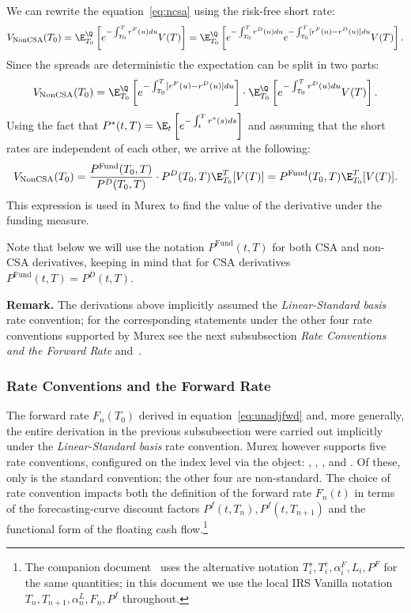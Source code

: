 \documentclass[]{pmv_report} %
\begin{document}
We can rewrite the equation~\eqref{eq:ncsa} using the risk-free short rate:
\begin{align*}
V_{\text{NonCSA}}(T_0)=\E_{T_0}^{\Q} \left[ e^{-\int_{T_0}^T r^F(u)du} V(T)\right] =\E_{T_0}^{\Q} \left[ e^{-\int_{T_0}^T r^D(u)du} e^{-\int_{T_0}^T [r^F(u)-r^D(u)]du}V(T)\right].
\end{align*}
Since the spreads are deterministic the expectation can be split in two parts:
\begin{equation*}
V_{\text{NonCSA}}({T_0})= \E_{T_0}^{\Q} \left[ e^{-\int_{T_0}^T [r^F(u)-r^D(u)]du}\right] \cdot \E_{T_0}^{\Q} \left[ e^{-\int_{T_0}^T r^D(u)du} V(T)\right].
\end{equation*}
Using the fact that $P^*(t,T)=\E_t\left[ e^{-\int_t^T r^*(s)ds} \right]$ and assuming that the short rates are independent of each other, we arrive at the following:
\begin{equation}
\label{eq:noncsa}
V_{\text{NonCSA}}({T_0})=\frac{P^\text{Fund}(T_0,T) }{P^D({T_0},T)} \cdot P^D(T_0,T) \E_{T_0}^T[V(T)] = P^{\text{Fund}}({T_0},T)\E_{T_0}^T[V(T)].
\end{equation}
This expression is used in Murex to find the value of the derivative under the funding measure.

Note that below we will use the notation $P^{\text{Fund}}(t,T) $ for both CSA and non-CSA derivatives, keeping in mind that for CSA derivatives $P^{\text{Fund}}(t,T)=P^D(t,T)$.

\textbf{Remark.} The derivations above implicitly assumed the \textit{Linear-Standard basis} rate convention; for the corresponding statements under the other four rate conventions supported by Murex see the next subsubsection \textit{Rate Conventions and the Forward Rate} and~\cite{Mx.RateCurve}.

\subsubsection{Rate Conventions and the Forward Rate}
\label{sec:RateConventions}

The forward rate $F_n(T_0)$ derived in equation~\eqref{eq:unadjfwd} and, more generally, the entire derivation in the previous subsubsection were carried out implicitly under the \textit{Linear-Standard basis} rate convention.
Murex however supports five rate conventions, configured on the index level via the  object: , , ,  and .
Of these, only  is the standard convention; the other four are non-standard.
The choice of rate convention impacts both the definition of the forward rate $F_n(t)$ in terms of the forecasting-curve discount factors $P^f(t,T_n),P^f(t,T_{n+1})$ and the functional form of the floating cash flow.\footnote{The companion document~\cite{ConvexityAdjustments} %
uses the alternative notation $T_i^s, T_i^e, \alpha_i^F, L_i, P^F$ for the same quantities; in this document we use the local IRS Vanilla notation $T_n, T_{n+1}, \alpha_n^L, F_n, P^f$ throughout.}
\end{document}

